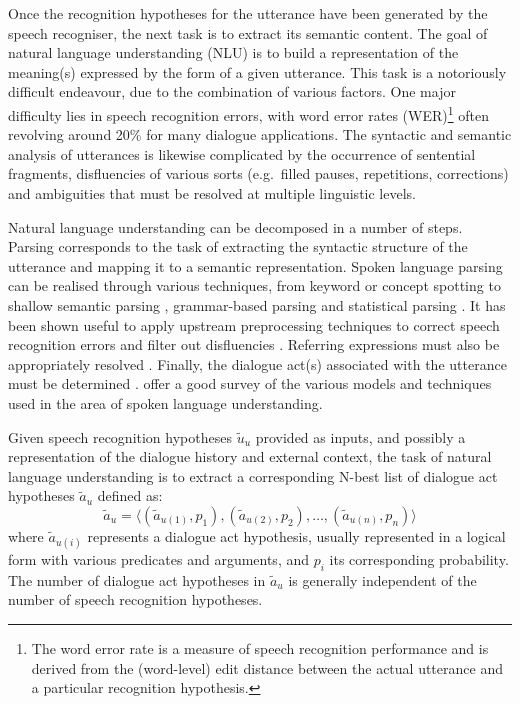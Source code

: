 Once the recognition hypotheses for the utterance have been generated by the speech recogniser, the next task is to extract its semantic content.  The goal of natural language understanding (NLU) is to build a representation of the meaning(s) expressed by the form of a given utterance.  This task is a notoriously difficult endeavour, due to the combination of various factors. One major difficulty lies in speech recognition errors, with word error rates (WER)\footnote{The word error rate is a measure of speech recognition performance and is derived from the (word-level) edit distance between the actual utterance and a particular recognition hypothesis.} often revolving around 20\% for many dialogue applications.  The syntactic and semantic analysis of utterances is likewise complicated by the occurrence of sentential fragments,  disfluencies of various sorts (e.g.\ filled pauses, repetitions, corrections) and ambiguities that must be resolved at multiple linguistic levels. 

Natural language understanding can be decomposed in a number of steps.  Parsing corresponds to the task of extracting the syntactic structure of the utterance and mapping it to a semantic representation.  Spoken language parsing can be realised through various techniques, from keyword or concept spotting \citep{KomataniTKK01,ZhangZY07} to shallow semantic parsing \citep{Coppola:2009}, grammar-based parsing \citep{VanNoord1999} and statistical parsing \citep{He200585}.  It has been shown useful to apply upstream preprocessing techniques to correct speech recognition errors \citep{Ringger:1996} and filter out disfluencies \citep{Johnson:2004}. Referring expressions must also be appropriately resolved \citep{Funakoshi:2012}.  Finally, the dialogue act(s) associated with the utterance must be determined \citep{stolcke2000,Keizer2007}. \cite{demori2008} offer a good survey of the various models and techniques used in the area of spoken language understanding. 

Given speech recognition hypotheses $\tilde{u}_u$ provided as inputs, and possibly a representation of the dialogue history and external context, the task of natural language understanding is to extract a corresponding N-best list of dialogue act hypotheses $\tilde{a}_u$ defined as: \begin{equation*}
\tilde{a}_u = \langle (\tilde{a}_{u(1)}, p_{1}), (\tilde{a}_{u(2)}, p_{2}), \dots, (\tilde{a}_{u(n)}, p_{n})\rangle
\end{equation*}
where $\tilde{a}_{u(i)}$ represents a dialogue act hypothesis, usually represented in a logical form with various predicates and arguments, and $p_{i}$ its corresponding probability. The number of dialogue act hypotheses in $\tilde{a}_u$ is generally independent of the number of speech recognition hypotheses.

